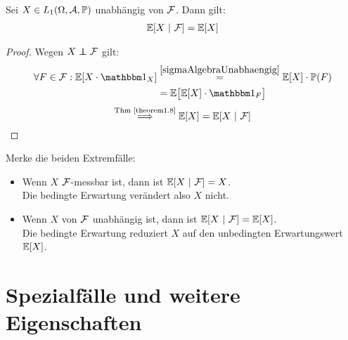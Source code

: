 \begin{theorem} %
Sei $X\in L_1(\Omega,\mathcal{A},\mathbb{P})$ unabhängig von $\mathcal{F}$. Dann gilt:
\begin{align*}
\mathbb{E}[X~|~\mathcal{F}]=\mathbb{E}[X]
\end{align*}
\end{theorem}

\begin{proof}
Wegen $X\unab\F$ gilt:
\begin{align*}
\forall F\in\F:\E[X\cdot\indi_X]
&\stackeq{\ref{sigmaAlgebraUnabhaengig}}
\E[X]\cdot\P(F)\\
&=\E\big[\E[X]\cdot\indi_F\big]
\end{align*}
\[\stackrel{\text{Thm \ref{theorem1.8}}}{\Longrightarrow} \mathbb{E}[X]=\mathbb{E}[X~|~\mathcal{F}]\]
\end{proof}

\begin{bemerkung}
Merke die beiden Extremfälle:
\begin{itemize}
\item Wenn $X$ $\mathcal{F}$-messbar ist, dann ist $\mathbb{E}[X~|~\mathcal{F}]=X$.\\
Die bedingte Erwartung verändert also $X$ nicht.
\item Wenn $X$ von $\mathcal{F}$ unabhängig ist, dann ist $\mathbb{E}[X~|~\mathcal{F}]=\mathbb{E}[X]$.\\
Die bedingte Erwartung reduziert $X$ auf den unbedingten Erwartungswert $\mathbb{E}[X]$.
\end{itemize}
\end{bemerkung}

\setcounter{section}{2}
\section{Spezialfälle und weitere Eigenschaften} %
\setcounter{section}{1}
\setcounter{satz}{9}

